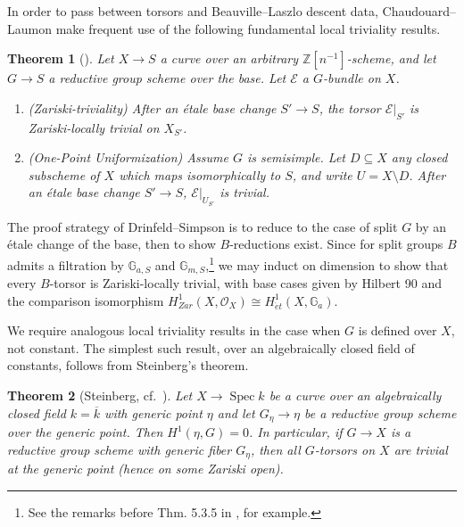 \documentclass[openany]{amsbook}
\newtheorem{theorem}{Theorem}[chapter]
\theoremstyle{definition}
\theoremstyle{remark}
\numberwithin{equation}{section}
\newcommand{\Z}{\mathbb{Z}}
\newcommand{\G}{\mathbb{G}}
\renewcommand{\O}{\mathcal{O}}
\newcommand{\cE}{\mathcal{E}}
\newcommand{\ol}[1]{\overline{#1}}
\renewcommand{\-}{\operatorname{-}}
\newcommand{\Spec}{\operatorname{Spec}}
\newcommand{\et}{\acute{e}t}
\begin{document}
In order to pass between torsors and Beauville--Laszlo descent data, Chaudouard--Laumon make frequent use of the following fundamental local triviality results.
\begin{theorem}[\cite{drinfeldsimpson}]
    Let $X \to S$ a curve over an arbitrary $\Z[n^{-1}]$-scheme, and let $G \to S$ a reductive group scheme over the base. Let $\cE$ a $G$-bundle on $X$.
    \begin{enumerate}
        \item (Zariski-triviality) After an \'etale base change $S' \to S$, the torsor $\cE|_{S'}$ is Zariski-locally trivial on $X_{S'}$.
        \item (One-Point Uniformization) Assume $G$ is semisimple. Let $D \subseteq X$ any closed subscheme of $X$ which maps isomorphically to $S$, and write $U = X \setminus D$. After an \'etale base change $S' \to S$, $\cE|_{U_{S'}}$ is trivial. 
    \end{enumerate}
\end{theorem}
The proof strategy of Drinfeld--Simpson is to reduce to the case of split $G$ by an \'etale change of the base, then to show $B$-reductions exist. Since for split groups $B$ admits a filtration by $\G_{a,S}$ and $\G_{m,S}$,\footnote{See the remarks before Thm. 5.3.5 in \cite{conradrgs}, for example.} we may induct on dimension to show that every $B$-torsor is Zariski-locally trivial, with base cases given by Hilbert 90 and the comparison isomorphism $H^1_{Zar}(X, \O_X) \cong H^1_{\et}(X, \G_a)$. 

We require analogous local triviality results in the case when $G$ is defined over $X$, not constant. The simplest such result, over an algebraically closed field of constants, follows from Steinberg's theorem.
\begin{theorem}[Steinberg, cf.\ ]\label{thm.steinberg}
    Let $X \to \Spec k$ be a curve over an algebraically closed field $k = \ol{k}$ with generic point $\eta$ and let $G_\eta \to \eta$ be a reductive group scheme over the generic point. Then $H^1(\eta, G) = 0$. In particular, if $G \to X$ is a reductive group scheme with generic fiber $G_\eta$, then all $G$-torsors on $X$ are trivial at the generic point (hence on some Zariski open).
\end{theorem}
\end{document}
